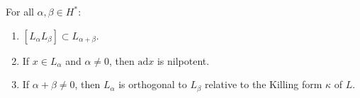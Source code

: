 For all $\alpha, \beta \in H^*$:
\begin{enumerate}
\item $[L_{\alpha} L_{\beta}] \subset L_{\alpha+\beta}$.
\item If $x \in L_{\alpha}$ and $\alpha \neq 0$, then $\mathrm{ad} x$ is nilpotent.
\item If $\alpha+\beta \neq 0$, then $L_{\alpha}$ is orthogonal to $L_{\beta}$ relative to the Killing form $\kappa$ of $L$.
\end{enumerate}
